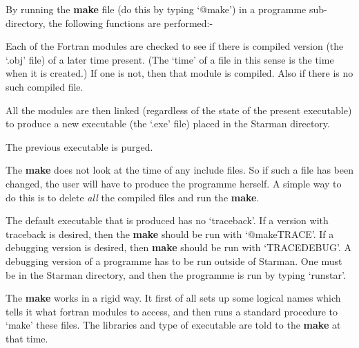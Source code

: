By running the {\bf make} file (do this by typing `@make') in a programme
sub-directory, the following functions are performed:-

\begin{list}{{-}}{}

\item Each of the Fortran modules are checked to see if there is compiled
      version (the `.obj' file) of a later time present. (The `time' of a 
      file in this sense is the time when it is created.) If one is not, 
      then that module is compiled. Also if there is no such compiled file. 

\item All the modules are then linked (regardless of the state of the 
      present executable) to produce a new executable (the `.exe' file)
      placed in the Starman directory.

\item The previous executable is purged.

\end{list}

The {\bf make} does not look at the time of any include files. So if such
a file has been changed, the user will have to produce the programme herself.
A simple way to do this is to delete {\em all} the compiled files and
run the {\bf make}.

The default executable that is produced has no `traceback'. If a version
with traceback is desired, then the {\bf make} should be run with 
\mbox{`@make\hspace{0.5em}TRACE'}. If a debugging version is desired, then {\bf make}
should be run with \mbox{`\@make\hspace{0.5em}TRACE\hspace{0.5em}DEBUG'}. A debugging
version of a programme has to be run outside of Starman. One must be
in the Starman directory, and then the programme is run by typing
\mbox{`runstar'}.

\vspace*{3mm}

The {\bf make} works in a rigid way. It first of all sets up some logical 
names which tells it what fortran modules to access, and then runs a 
standard procedure to `make' these files. The libraries and type of
executable are told to the {\bf make} at that time. 

